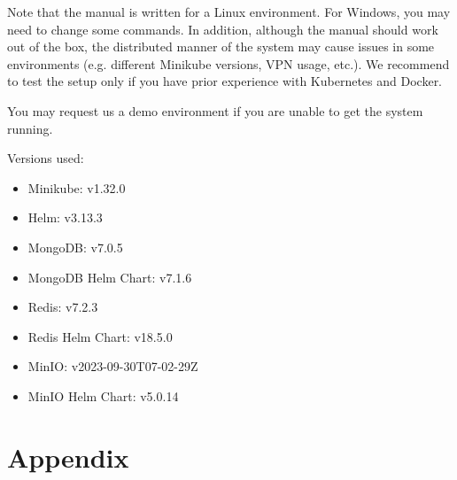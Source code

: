 \documentclass{report}
\begin{document}
    Note that the manual is written for a Linux environment. For Windows, you may need to change some commands. In addition, although the manual should work out of the box, the distributed manner of the system may cause issues in some environments (e.g. different Minikube versions, VPN usage, etc.). We recommend to test the setup only if you have prior experience with Kubernetes and Docker.

    You may request us a demo environment if you are unable to get the system running.

    Versions used:
    \begin{itemize}
        \item Minikube: v1.32.0
        \item Helm: v3.13.3
        \item MongoDB: v7.0.5
        \item MongoDB Helm Chart: v7.1.6
        \item Redis: v7.2.3
        \item Redis Helm Chart: v18.5.0
        \item MinIO: v2023-09-30T07-02-29Z
        \item MinIO Helm Chart: v5.0.14
    \end{itemize}

    \section{Appendix}
\end{document}
